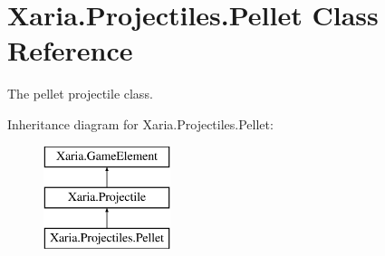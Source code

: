 \hypertarget{classXaria_1_1Projectiles_1_1Pellet}{}\section{Xaria.\+Projectiles.\+Pellet Class Reference}
\label{classXaria_1_1Projectiles_1_1Pellet}


The pellet projectile class.  


Inheritance diagram for Xaria.\+Projectiles.\+Pellet\+:\begin{figure}[H]
\begin{center}
\leavevmode
\includegraphics[height=3.000000cm]{classXaria_1_1Projectiles_1_1Pellet}
\end{center}
\end{figure}
